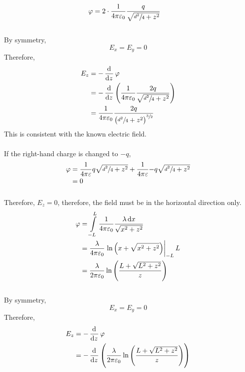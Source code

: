 \documentclass[fleqn, a4paper, 10pt, oneside]{scrartcl}
\theoremstyle{definition}
\theoremstyle{theorem}
\begin{document}
\begin{solution}
	\begin{tasks}
		\task
			\begin{align*}
				\varphi &= 2 \cdot \dfrac{1}{4 \pi \varepsilon_0} \dfrac{q}{\sqrt{\sfrac{d^2}{4} + z^2}}
			\end{align*}
			~\\
			By symmetry,
			\begin{equation*}
				E_x = E_y = 0
			\end{equation*}
			Therefore,
			\begin{align*}
				E_z &= -\dod{}{z} \varphi\\
				&= -\dod{}{z} \left( \dfrac{1}{4 \pi \varepsilon_0} \dfrac{2q}{\sqrt{\sfrac{d^2}{4} + z^2}} \right)\\
				&= \dfrac{1}{4 \pi \varepsilon_0} \dfrac{2q}{\left( \sfrac{d^2}{4} + z^2 \right)^{\sfrac{3}{2}}}
			\end{align*}
			This is consistent with the known electric field.\\
			~\\
			If the right-hand charge is changed to $-q$,
			\begin{align*}
				\varphi &= \dfrac{1}{4 \pi \varepsilon}{q}{\sqrt{\sfrac{d^2}{4} + z^2}} + \dfrac{1}{4 \pi \varepsilon}{-q}{\sqrt{\sfrac{d^2}{4} + z^2}}\\
				&= 0
			\end{align*}\\
			Therefore, $E_z = 0$, therefore, the field must be in the horizontal direction only.
		\task
			\begin{align*}
				\varphi &= \int\limits_{-L}^{L} \dfrac{1}{4 \pi \varepsilon_0} \dfrac{\lambda \dif x}{\sqrt{x^2 + z^2}}\\
				&= \dfrac{\lambda}{4 \pi \varepsilon_0} \left. \ln \left( x + \sqrt{x^2 + z^2} \right) \right|_{-L}{L}\\
				&= \dfrac{\lambda}{2 \pi \varepsilon_0} \ln \left( \dfrac{L + \sqrt{L^2 + z^2}}{z} \right)
			\end{align*}
			~\\
			By symmetry,
			\begin{equation*}
				E_x = E_y = 0
			\end{equation*}
			Therefore,
			\begin{align*}
				E_z &= -\dod{}{z} \varphi\\
				&= -\dod{}{z} \left( \dfrac{\lambda}{2 \pi \varepsilon_0} \ln \left( \dfrac{L + \sqrt{L^2 + z^2}}{z} \right) \right)\\

\end{align*}
\end{tasks}
\end{solution}
\end{document}
